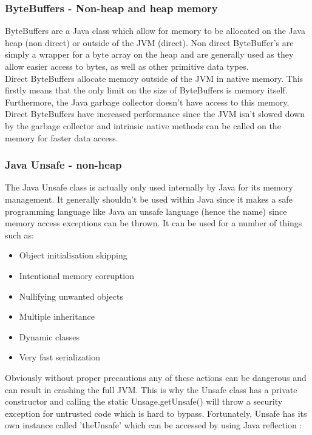 \documentclass[final_report.tex]{subfiles}
\begin{document}
\subsubsection{ByteBuffers - Non-heap and heap memory}
ByteBuffers are a Java class which allow for memory to be allocated on the Java heap (non direct) or outside of the JVM (direct). Non direct ByteBuffer's are simply a wrapper for a byte array on the heap and are generally used as they allow easier access to bytes, as well as other primitive data types. \\
\newline
Direct ByteBuffers allocate memory outside of the JVM in native memory. This firstly means that the only limit on the size of ByteBuffers is memory itself. Furthermore, the Java garbage collector doesn't have access to this memory. Direct ByteBuffers have increased performance since the JVM isn't slowed down by the garbage collector and intrinsic native methods can be called on the memory for faster data access.

\subsubsection{Java Unsafe - non-heap}
The Java Unsafe class is actually only used internally by Java for its memory management. It generally shouldn't be used within Java since it makes a safe programming language like Java an unsafe language (hence the name) since memory access exceptions can be thrown. It can be used for a number of things such as:

\begin{itemize}
	\item Object initialisation skipping
	\item Intentional memory corruption
	\item Nullifying unwanted objects
	\item Multiple inheritance
	\item Dynamic classes
	\item Very fast serialization
\end{itemize}

Obviously without proper precautions any of these actions can be dangerous and can result in crashing the full JVM. This is why the Unsafe class has a private constructor and calling the static Unsage.getUnsafe() will throw a security exception for untrusted code which is hard to bypass. Fortunately, Unsafe has its own instance called 'theUnsafe' which can be accessed by using Java reflection :
\end{document}
